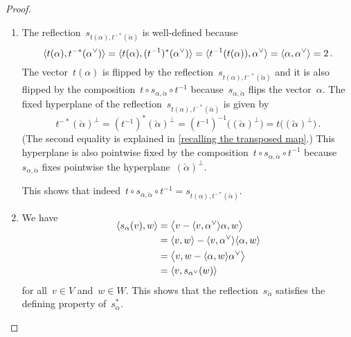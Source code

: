 \begin{proof}
  \leavevmode
  \begin{enumerate}
    \item
      The reflection~$s_{t(\alpha), t^{-*}(\check{\alpha})}$ is well-defined because
      \[
        \pair{t(\alpha), t^{-*}(\check{\alpha})}
        =
        \pair{t(\alpha), (t^{-1})^*(\check{\alpha})}
        =
        \pair{t^{-1}(t(\alpha)), \check{\alpha}}
        =
        \pair{\alpha, \check{\alpha}}
        =
        2 \,.
      \]
      The vector~$t(\alpha)$ is flipped by the reflection~$s_{t(\alpha), t^{-*}(\check{\alpha})}$ and it is also flipped by the composition~$t \circ s_{\alpha, \check{\alpha}} \circ t^{-1}$ because~$s_{\alpha, \check{\alpha}}$ flips the vector~$\alpha$.
      The fixed hyperplane of the reflection~$s_{t(\alpha), t^{-*}(\check{\alpha})}$ is given by
      \[
        t^{-*}( \check{\alpha} )^\perp
        =
        (t^{-1})^*(\check{\alpha})^\perp
        =
        (t^{-1})^{-1}\bigl( (\check{\alpha})^\perp \bigr)
        =
        t\bigl( (\check{\alpha})^\perp \bigr) \,.
      \]
      (The second equality is explained in \cref{recalling the transposed map}.)
      This hyperplane is also pointwise fixed by the composition~$t \circ s_{\alpha, \check{\alpha}} \circ t^{-1}$ because~$s_{\alpha, \check{\alpha}}$ fixes pointwise the hyperplane~$(\check{\alpha})^\perp$.
      
      This shows that indeed~$t \circ s_{\alpha, \check{\alpha}} \circ t^{-1} = s_{t(\alpha), t^{-*}(\check{\alpha})}$.
    \item
      We have
      \begin{align*}
        \SwapAboveDisplaySkip
        \pair{s_{\alpha}(v), w}
        &=
        \pair[\big]{v - \pair{v, \check{\alpha}} \alpha, w}
        \\
        &=
        \pair{v, w} - \pair{v, \check{\alpha}} \pair{\alpha, w}
        \\
        &=
        \pair[\big]{v, w - \pair{\alpha, w} \check{\alpha}}
        \\
        &=
        \pair{v, s_{\check{\alpha}}(w)}
      \end{align*}
      for all~$v \in V$ and~$w \in W$.
      This shows that the reflection~$s_{\check{\alpha}}$ satisfies the defining property of~$s_\alpha^*$.
    \qedhere
  \end{enumerate}
\end{proof}





